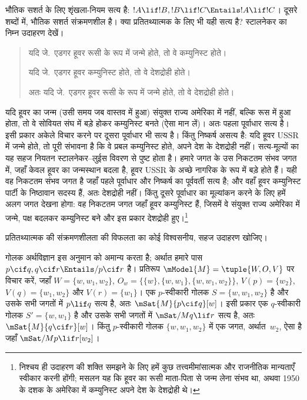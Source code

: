 \documentclass[../../../include/open-logic-section]{subfiles}
\begin{document}


भौतिक सशर्त के लिए शृंखला-नियम सत्य है:
$!A \lif !B, !B \lif !C \Entails !A \lif !C$। दूसरे शब्दों में, भौतिक
सशर्त संक्रमणशील है। क्या प्रतितथ्यात्मक के लिए भी यही सत्य है? स्टालनेकर
का निम्न उदाहरण देखें।
\begin{quote}
  यदि जे.~एडगर हूवर रूसी के रूप में जन्मे होते, तो वे कम्युनिस्ट होते।

  यदि जे.~एडगर हूवर कम्युनिस्ट होते, तो वे देशद्रोही होते।

  अतः यदि जे.~एडगर हूवर रूसी के रूप में जन्मे होते, तो वे देशद्रोही होते।
\end{quote}
यदि हूवर का जन्म (उसी समय जब वास्तव में हुआ) संयुक्त राज्य अमेरिका में
नहीं, बल्कि रूस में हुआ होता, तो वे सोवियत संघ में बड़े होकर कम्युनिस्ट बनते
(ऐसा मान लें)। अतः पहला पूर्वाधार सत्य है। इसी प्रकार अकेले विचार करने पर
दूसरा पूर्वाधार भी सत्य है। किंतु निष्कर्ष असत्य है: यदि हूवर USSR में जन्मे
होते, तो पूरी संभावना है कि वे प्रबल कम्युनिस्ट होते, अपने देश के देशद्रोही
नहीं। सत्य-मूल्यों का यह सहज नियतन स्टालनेकर--लुईस विवरण से पुष्ट होता है।
हमारे जगत के उस निकटतम संभव जगत में, जहाँ केवल हूवर का जन्मस्थान बदला है,
हूवर USSR के अच्छे नागरिक के रूप में बड़े होते हैं। यही वह निकटतम संभव जगत
है जहाँ पहले पूर्वाधार और निष्कर्ष का पूर्ववर्ती सत्य है; और वहाँ हूवर
कम्युनिस्ट पार्टी के निष्ठावान सदस्य हैं, अतः देशद्रोही नहीं। किंतु दूसरे
पूर्वाधार का मूल्यांकन करने के लिए हमें अलग जगत देखना होगा: वह निकटतम जगत
जहाँ हूवर कम्युनिस्ट हैं, जिसमें वे संयुक्त राज्य अमेरिका में जन्मे, पक्ष
बदलकर कम्युनिस्ट बने और इस प्रकार देशद्रोही हुए।\footnote{निश्चय ही उदाहरण
  की शक्ति समझने के लिए हमें कुछ तत्त्वमीमांसात्मक और राजनीतिक मान्यताएँ
  स्वीकार करनी होंगी; मसलन यह कि हूवर का रूसी माता-पिता से जन्म लेना संभव
  था, अथवा 1950 के दशक के अमेरिका में कम्युनिस्ट अपने देश के देशद्रोही थे।}

\begin{prob}
  प्रतितथ्यात्मक की संक्रमणशीलता की विफलता का कोई विश्वसनीय, सहज उदाहरण
  खोजिए।
\end{prob}

\begin{ex}
  गोलक अर्थविज्ञान इस अनुमान को अमान्य करता है; अर्थात हमारे पास $p
  \cif q, q \cif r \Entails/ p \cif r$ है। प्रतिरूप $\mModel{M}
  = \tuple{W, O, V}$ पर विचार करें, जहाँ $W = \{w, w_1, w_2\}$,
  $O_w = \{\{w\}, \{w, w_1\}, \{w, w_1, w_2\}\}$,
  $V(p) = \{w_2\}$, $V(q) = \{w_1, w_2\}$ और $V(r) = \{w_1\}$।
  एक $p$-स्वीकारी गोलक $S = \{w, w_1, w_2\}$ है और उसके सभी जगतों
  में $p \lif q$ सत्य है, अतः $\mSat{M}{p \cif q}[w]$। इसी प्रकार एक
  $q$-स्वीकारी गोलक $S' = \{w, w_1\}$ है और उसके सभी जगतों में
  $\mSat/{M}{q \lif r}$ सत्य है, अतः $\mSat{M}{q \cif r}[w]$। किंतु
  $p$-स्वीकारी गोलक $\{w, w_1, w_2\}$ में एक जगत, अर्थात~$w_2$, ऐसा
  है जहाँ $\mSat/{M}{p \lif r}[w_2]$।
\end{ex}
\end{document}
